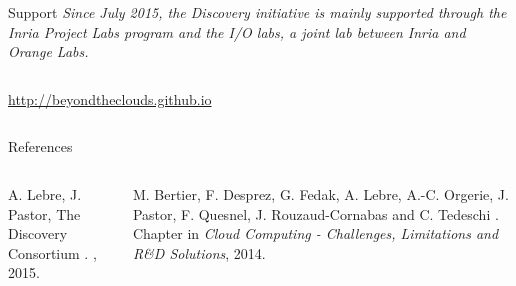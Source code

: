 \documentclass[final,t]{beamer}
\begin{document}
\begin{frame}[fragile]{}
\begin{columns}[t]
\begin{column}{.49\linewidth}
\vspace{1cm}

\begin{block}{\Large Support}
\textit{\Large Since July 2015, the Discovery initiative is mainly supported through the Inria Project Labs program and the I/O labs, a joint lab between Inria and Orange Labs.}
\end{block}

    \end{column}

  \end{columns}








        \begin{columns}[T]
        \begin{column}{0.95\linewidth}

\vspace{0.8cm}

{ \hfill \LARGE \textcolor{i6colorscheme1}{\url{http://beyondtheclouds.github.io}} \hfill}
\vspace{0.5cm}
        \end{column}
        \end{columns}



      \begin{block}{\Large References}
        \begin{columns}[T]
        \begin{column}{0.45\linewidth}
     \vspace{-0.8cm}
      \begin{thebibliography}{1}
	\begin{normalsize}
        {\sc A. Lebre, J. Pastor, The Discovery Consortium}
.
, 2015.
        \end{normalsize}
      \end{thebibliography}
        \end{column}

	\begin{column}{0.45\linewidth}
     \vspace{-0.8cm}
      \begin{thebibliography}{1}
        \begin{normalsize}
        {\sc M. Bertier, F. Desprez, G. Fedak, A. Lebre, A.-C. Orgerie, J. Pastor, F. Quesnel, J. Rouzaud-Cornabas and C. Tedeschi}
.
\newblock Chapter in {\em Cloud Computing - Challenges, Limitations and R\&D Solutions}, 2014.
	\end{normalsize}
      \end{thebibliography}
        \end{column}


\end{columns}
\end{block}
\end{frame}
\end{document}
